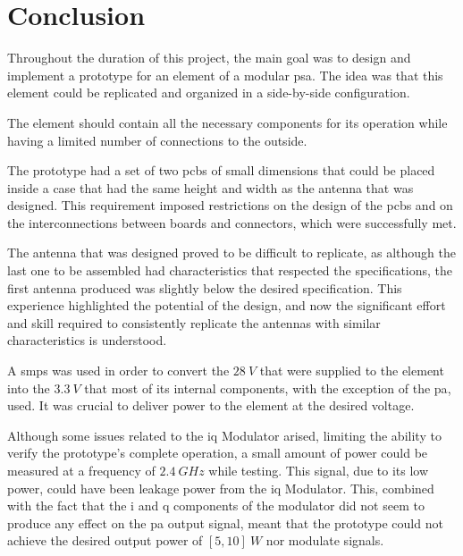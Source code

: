 \chapter{Conclusion}
\label{chapter:conclusion}

\par Throughout the duration of this project, the main goal was to design and implement a prototype for an element of a modular \ac{psa}. The idea was that this element could be replicated and organized in a side-by-side configuration. 

\par The element should contain all the necessary components for its operation while having a limited number of connections to the outside.

\par The prototype had a set of two \ac{pcb}s of small dimensions that could be placed inside a case that had the same height and width as the antenna that was designed. This requirement imposed restrictions on the design of the \ac{pcb}s and on the interconnections between boards and connectors, which were successfully met.

\par The antenna that was designed proved to be difficult to replicate, as although the last one to be assembled had characteristics that respected the specifications, the first antenna produced was slightly below the desired specification. This experience highlighted the potential of the design, and now the significant effort and skill required to consistently replicate the antennas with similar characteristics is understood.

\par A \ac{smps} was used in order to convert the $28\:\si{V}$ that were supplied to the element into the $3.3\:\si{V}$ that most of its internal components, with the exception of the \ac{pa}, used. It was crucial to deliver power to the element at the desired voltage.

\par Although some issues related to the \ac{iq} Modulator arised, limiting the ability to verify the prototype's complete operation, a small amount of power could be measured at a frequency of $2.4\:\si{GHz}$ while testing. This signal, due to its low power, could have been leakage power from the \ac{iq} Modulator. This, combined with the fact that the \ac{i} and \ac{q} components of the modulator did not seem to produce any effect on the \ac{pa} output signal, meant that the prototype could not achieve the desired output power of $[5, 10] \:\si{W}$ nor modulate signals.

